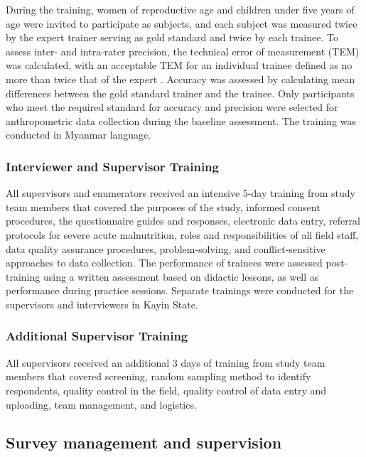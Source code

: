 \documentclass[12pt,a4paper]{article}
\begin{document}
During the training, women of reproductive age and children under five years of age were invited to participate as subjects, and each subject was measured twice by the expert trainer serving as gold standard and twice by each trainee. To assess inter- and intra-rater precision, the technical error of measurement (TEM) was calculated, with an acceptable TEM for an individual trainee defined as no more than twice that of the expert \citep{ulijaszek_kerr_1999}. Accuracy was assessed by calculating mean differences between the gold standard trainer and the trainee. Only participants who meet the required standard for accuracy and precision were selected for anthropometric data collection during the baseline assessment. The training was conducted in Myanmar language.

\hypertarget{interview-training}{%
\subsubsection{Interviewer and Supervisor Training}\label{interview-training}}

All supervisors and enumerators received an intensive 5-day training from study team members that covered the purposes of the study, informed consent procedures, the questionnaire guides and responses, electronic data entry, referral protocols for severe acute malnutrition, roles and responsibilities of all field staff, data quality assurance procedures, problem-solving, and conflict-sensitive approaches to data collection. The performance of trainees were assessed post-training using a written assessment based on didactic lessons, as well as performance during practice sessions. Separate trainings were conducted for the supervisors and interviewers in Kayin State.

\hypertarget{add-training}{%
\subsubsection{Additional Supervisor Training}\label{add-training}}

All supervisors received an additional 3 days of training from study team members that covered screening, random sampling method to identify respondents, quality control in the field, quality control of data entry and uploading, team management, and logistics.

\hypertarget{survy-management}{%
\subsection{Survey management and supervision}\label{survy-management}}
\end{document}

